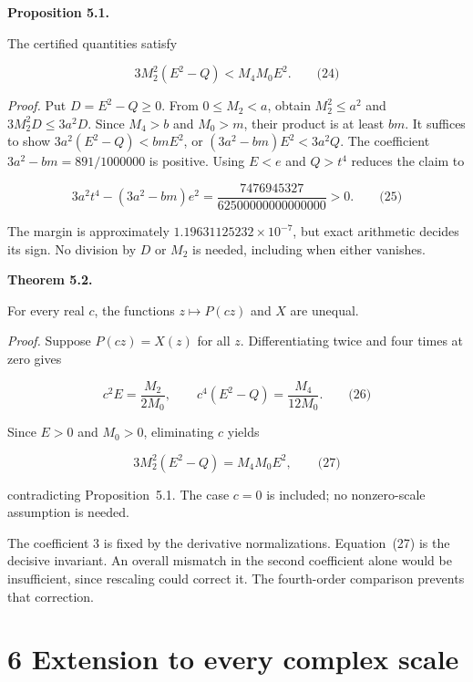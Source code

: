 \documentclass[
  11pt,
]{article}
\begin{document}
\textbf{Proposition 5.1.}

The certified quantities satisfy

\[3M_{2}^{2}\left( E^{2} - Q \right) < M_{4}M_{0}E^{2}.\quad\quad\text{(24)}\]

\emph{Proof.} Put \(D = E^{2} - Q \geq 0\). From \(0 \leq M_{2} < a\), obtain \(M_{2}^{2} \leq a^{2}\) and \(3M_{2}^{2}D \leq 3a^{2}D\). Since \(M_{4} > b\) and \(M_{0} > m\), their product is at least \(bm\). It suffices to show \(3a^{2}\left( E^{2} - Q \right) < bmE^{2}\), or \(\left( 3a^{2} - bm \right)E^{2} < 3a^{2}Q\). The coefficient \(3a^{2} - bm = 891/1000000\) is positive. Using \(E < e\) and \(Q > t^{4}\) reduces the claim to

\[3a^{2}t^{4} - \left( 3a^{2} - bm \right)e^{2} = \frac{7476945327}{62500000000000000} > 0.\quad\quad\text{(25)}\]

The margin is approximately \(1.19631125232 \times 10^{- 7}\), but exact arithmetic decides its sign. No division by \(D\) or \(M_{2}\) is needed, including when either vanishes.

\textbf{Theorem 5.2.}

For every real \(c\), the functions \(z \mapsto P(cz)\) and \(X\) are unequal.

\emph{Proof.} Suppose \(P(cz) = X(z)\) for all \(z\). Differentiating twice and four times at zero gives

\[c^{2}E = \frac{M_{2}}{2M_{0}},\quad\quad c^{4}\left( E^{2} - Q \right) = \frac{M_{4}}{12M_{0}}.\quad\quad\text{(26)}\]

Since \(E > 0\) and \(M_{0} > 0\), eliminating \(c\) yields

\[3M_{2}^{2}\left( E^{2} - Q \right) = M_{4}M_{0}E^{2},\quad\quad\text{(27)}\]

contradicting Proposition~5.1. The case \(c = 0\) is included; no nonzero-scale assumption is needed.

The coefficient \(3\) is fixed by the derivative normalizations. Equation~(27) is the decisive invariant. An overall mismatch in the second coefficient alone would be insufficient, since rescaling could correct it. The fourth-order comparison prevents that correction.

\hypertarget{extension-to-every-complex-scale}{%
\section{6 Extension to every complex scale}\label{extension-to-every-complex-scale}}
\end{document}
